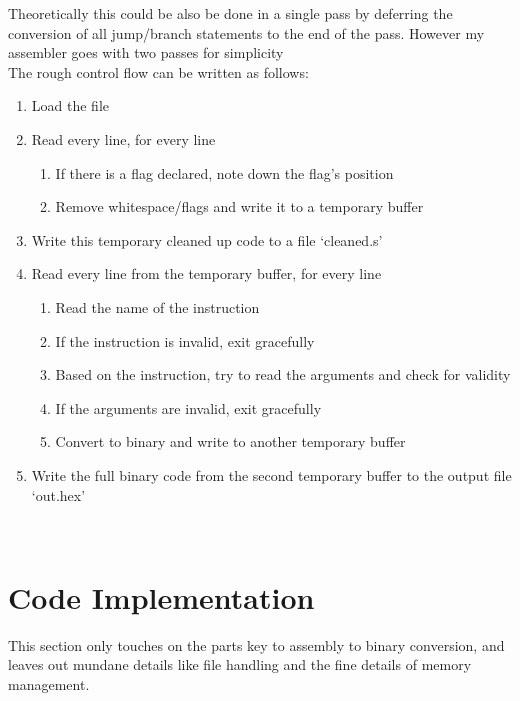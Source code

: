 \documentclass[journal,12pt,onecolumn]{IEEEtran}
\theoremstyle{remark}
\begin{document}
	Theoretically this could be also be done in a single pass by deferring the conversion of all jump/branch statements to the end of the pass. However my assembler goes with two passes for simplicity\\
	The rough control flow can be written as follows:\\

	\begin{enumerate}
		\item{Load the file}
		
		\item{Read every line, for every line \begin{enumerate} 
			\item{If there is a flag declared, note down the flag's position}
			\item{Remove whitespace/flags and write it to a temporary buffer}
			\end{enumerate}}

		\item{Write this temporary cleaned up code to a file `cleaned.s'}

		\item{Read every line from the temporary buffer, for every line\begin{enumerate} 
			\item{Read the name of the instruction}
			\item{If the instruction is invalid, exit gracefully}
			\item{Based on the instruction, try to read the arguments and check for validity}
			\item{If the arguments are invalid, exit gracefully}
			\item{Convert to binary and write to another temporary buffer}
			\end{enumerate}}

		\item{Write the full binary code from the second temporary buffer to the output file `out.hex'}
	\end{enumerate}\\


	\section{Code Implementation}

		This section only touches on the parts key to assembly to binary conversion, and leaves out mundane details like file handling and the fine details of memory management.
\end{document}
